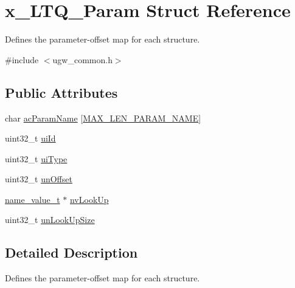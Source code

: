 \hypertarget{structx__LTQ__Param}{\section{x\-\_\-\-L\-T\-Q\-\_\-\-Param Struct Reference}
\label{structx__LTQ__Param}
}


Defines the parameter-\/offset map for each structure.  




{\ttfamily \#include $<$ugw\-\_\-common.\-h$>$}

\subsection*{Public Attributes}
\begin{DoxyCompactItemize}
\item 
char \hyperlink{structx__LTQ__Param_a6023ecf10fd4bdcafa9c291a29229355}{ac\-Param\-Name} \mbox{[}\hyperlink{group__LIBHELP_gaac5d922b6e3eb48b7ba829979fd73ae2}{M\-A\-X\-\_\-\-L\-E\-N\-\_\-\-P\-A\-R\-A\-M\-\_\-\-N\-A\-M\-E}\mbox{]}
\item 
uint32\-\_\-t \hyperlink{structx__LTQ__Param_abefad4567c0bd0638661ab6c294ba978}{ui\-Id}
\item 
uint32\-\_\-t \hyperlink{structx__LTQ__Param_a6418a8dffa891b6afd5caad55569b076}{ui\-Type}
\item 
uint32\-\_\-t \hyperlink{structx__LTQ__Param_a654550468915b45a7b78e570e741baf2}{un\-Offset}
\item 
\hyperlink{structname__value__t}{name\-\_\-value\-\_\-t} $\ast$ \hyperlink{structx__LTQ__Param_a8353f8dff855f22890e656ef2683cf14}{nv\-Look\-Up}
\item 
uint32\-\_\-t \hyperlink{structx__LTQ__Param_a33e8fa5cc148e6b0aa51cf67423d0d4e}{un\-Look\-Up\-Size}
\end{DoxyCompactItemize}


\subsection{Detailed Description}
Defines the parameter-\/offset map for each structure. 

